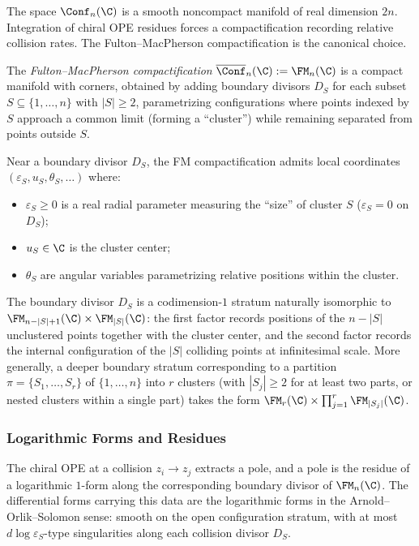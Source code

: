 The space $\Conf_n(\C)$ is a smooth noncompact manifold of real
dimension $2n$. Integration of chiral OPE residues forces a
compactification recording relative collision rates. The
Fulton--MacPherson compactification \cite{FM94} is the canonical
choice.

\begin{definition}
\label{def:FM_compactification}
The \emph{Fulton--MacPherson compactification} $\overline{\Conf}_n(\C) := \FM_n(\C)$ is a compact manifold with corners, obtained by adding boundary divisors $D_S$ for each subset $S \subseteq \{1,\ldots,n\}$ with $|S| \geq 2$, parametrizing configurations where points indexed by $S$ approach a common limit (forming a ``cluster'') while remaining separated from points outside $S$.
\end{definition}

\begin{remark}
Near a boundary divisor $D_S$, the FM compactification admits local coordinates $(\varepsilon_S, u_S, \theta_S, \ldots)$ where:
\begin{itemize}
\item $\varepsilon_S \geq 0$ is a real radial parameter measuring the ``size'' of cluster $S$ ($\varepsilon_S = 0$ on $D_S$);
\item $u_S \in \C$ is the cluster center;
\item $\theta_S$ are angular variables parametrizing relative positions within the cluster.
\end{itemize}
The boundary divisor $D_S$ is a codimension-$1$ stratum naturally isomorphic to $\FM_{n-|S|+1}(\C) \times \FM_{|S|}(\C)$: the first factor records positions of the $n - |S|$ unclustered points together with the cluster center, and the second factor records the internal configuration of the $|S|$ colliding points at infinitesimal scale. More generally, a deeper boundary stratum corresponding to a partition $\pi = \{S_1, \ldots, S_r\}$ of $\{1,\ldots,n\}$ into $r$ clusters (with $|S_j| \geq 2$ for at least two parts, or nested clusters within a single part) takes the form $\FM_r(\C) \times \prod_{j=1}^r \FM_{|S_j|}(\C)$.
\end{remark}

\subsubsection{Logarithmic Forms and Residues}

The chiral OPE at a collision $z_i \to z_j$ extracts a pole, and a
pole is the residue of a logarithmic $1$-form along the
corresponding boundary divisor of $\FM_n(\C)$. The differential
forms carrying this data are the logarithmic forms in the
Arnold--Orlik--Solomon sense: smooth on the open configuration
stratum, with at most $d\log\varepsilon_S$-type singularities along
each collision divisor $D_S$.

